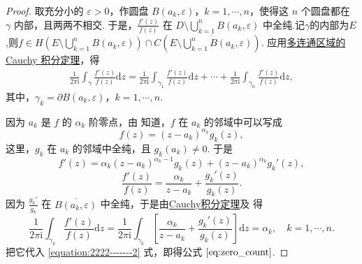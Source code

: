 \documentclass[../../main.tex]{subfiles}%
\begin{document}
\begin{proof}
 
取充分小的 \( \varepsilon > 0 \)，作圆盘 \( B(a_k, \varepsilon) \)，\( k = 1, \cdots, n \)，使得这 \( n \) 个圆盘都在 \( \gamma \) 内部，且两两不相交. 于是，\( \frac{f'(z)}{f(z)} \) 在 \( D \setminus \bigcup_{k=1}^{n} B(a_k, \varepsilon) \) 中全纯.记$\gamma$的内部为$E$,则$f\in H\left(E\setminus \bigcup_{k=1}^{n} B(a_k, \varepsilon)\right)\cap C\left(\overline{E\setminus \bigcup_{k=1}^{n} B(a_k, \varepsilon)}\right)$. 应用\hyperref[theorem:定理3.2.5]{多连通区域的 Cauchy 积分定理}，得
\begin{align}
\frac{1}{2\pi \mathrm{i}} \int_{\gamma} \frac{f'(z)}{f(z)} \mathrm{d}z = \frac{1}{2\pi \mathrm{i}} \int_{\gamma_1} \frac{f'(z)}{f(z)} \mathrm{d}z + \cdots + \frac{1}{2\pi \mathrm{i}} \int_{\gamma_n} \frac{f'(z)}{f(z)} \mathrm{d}z, \label{equation:2222-------2}
\end{align}
其中，\( \gamma_k = \partial B(a_k, \varepsilon) \)，\( k = 1, \cdots, n \).

因为 \( a_k \) 是 \( f \) 的 \( \alpha_k \) 阶零点，由 知道，\( f \) 在 \( a_k \) 的邻域中可以写成
\[
f(z) = (z - a_k)^{\alpha_k} g_k(z),
\]
这里，\( g_k \) 在 \( a_k \) 的邻域中全纯，且 \( g_k(a_k) \neq 0 \). 于是
\[
f'(z) = \alpha_k (z - a_k)^{\alpha_k - 1} g_k(z) + (z - a_k)^{\alpha_k} g_k'(z),
\]
\[
\frac{f'(z)}{f(z)} = \frac{\alpha_k}{z - a_k} + \frac{g_k'(z)}{g_k(z)}.
\]
因为 \( \frac{g_k'}{g_k} \) 在 \( \overline{B(a_k, \varepsilon)} \) 中全纯，于是由\hyperref[theorem:Cauchy-Goursat定理(Cauchy积分定理)]{Cauchy积分定理}及 得
\[
\frac{1}{2\pi \mathrm{i}}\int_{\gamma _k}{\frac{f' (z)}{f(z)}\mathrm{d}z}=\frac{1}{2\pi \mathrm{i}}\int_{\gamma _k}{\left[ \frac{\alpha _k}{z-a_k}+\frac{g_k' (z)}{g_k(z)} \right] \mathrm{d}z}=\alpha _k,\quad k=1,\cdots ,n.
\]
把它代入 \eqref{equation:2222-------2} 式，即得公式 \(\eqref{eq:zero_count}\).

\end{proof}
\end{document}
